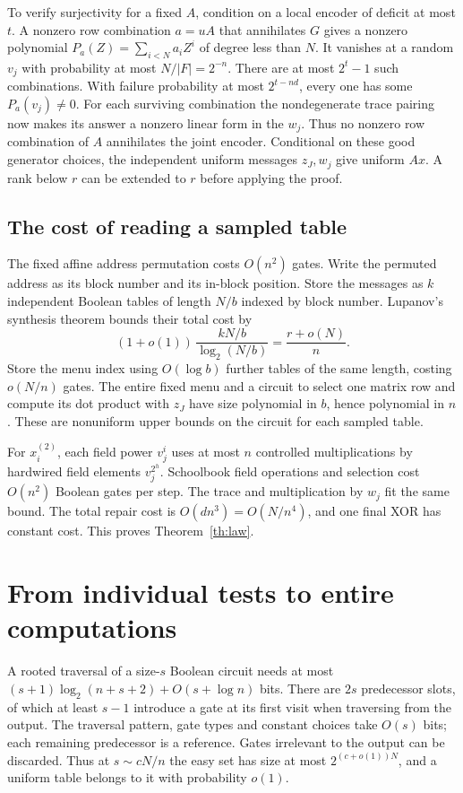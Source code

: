 \documentclass[11pt]{article}
\begin{document}
To verify surjectivity for a fixed $A$, condition on a local encoder of deficit at most $t$. A nonzero row combination $a=uA$ that annihilates $G$ gives a nonzero polynomial $P_a(Z)=\sum_{i<N}a_i Z^i$ of degree less than $N$. It vanishes at a random $v_j$ with probability at most $N/|F|=2^{-n}$. There are at most $2^t-1$ such combinations. With failure probability at most $2^{t-nd}$, every one has some $P_a(v_j)\ne0$. For each surviving combination the nondegenerate trace pairing now makes its answer a nonzero linear form in the $w_j$. Thus no nonzero row combination of $A$ annihilates the joint encoder. Conditional on these good generator choices, the independent uniform messages $z_J,w_j$ give uniform $Ax$. A rank below $r$ can be extended to $r$ before applying the proof.

\subsection{The cost of reading a sampled table}
The fixed affine address permutation costs $O(n^2)$ gates. Write the permuted address as its block number and its in-block position. Store the messages as $k$ independent Boolean tables of length $N/b$ indexed by block number. Lupanov's synthesis theorem \cite{lup} bounds their total cost by
\[
       (1+o(1))\,\frac{kN/b}{\log_2(N/b)}=\frac{r+o(N)}{n}.
\]
Store the menu index using $O(\log b)$ further tables of the same length, costing $o(N/n)$ gates. The entire fixed menu and a circuit to select one matrix row and compute its dot product with $z_J$ have size polynomial in $b$, hence polynomial in $n$. These are nonuniform upper bounds on the circuit for each sampled table.

For $x^{(2)}_i$, each field power $v_j^i$ uses at most $n$ controlled multiplications by hardwired field elements $v_j^{2^h}$. Schoolbook field operations and selection cost $O(n^2)$ Boolean gates per step. The trace and multiplication by $w_j$ fit the same bound. The total repair cost is $O(d n^3)=O(N/n^4)$, and one final XOR has constant cost. This proves Theorem~\ref{th:law}.

\section{From individual tests to entire computations}
A rooted traversal of a size-$s$ Boolean circuit needs at most $(s+1)\log_2(n+s+2)+O(s+\log n)$ bits. There are $2s$ predecessor slots, of which at least $s-1$ introduce a gate at its first visit when traversing from the output. The traversal pattern, gate types and constant choices take $O(s)$ bits; each remaining predecessor is a reference. Gates irrelevant to the output can be discarded. Thus at $s\sim cN/n$ the easy set has size at most $2^{(c+o(1))N}$, and a uniform table belongs to it with probability $o(1)$.
\end{document}
